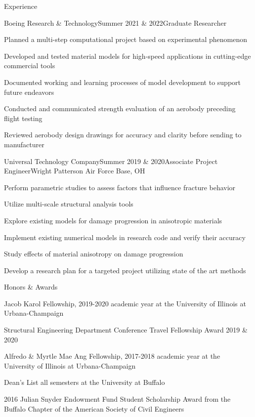 \documentclass{resume} %
\begin{document}
\begin{rSection}{Experience}

\begin{rSubsection}{Boeing Research \& Technology}{Summer 2021  \& 2022}{Graduate Researcher}{}
%
\item Planned a multi-step computational project based on experimental phenomenon
\item Developed and tested material models for high-speed applications in cutting-edge commercial tools
\item Documented working and learning processes of model development to support future endeavors
\item Conducted and communicated strength evaluation of an aerobody preceding flight testing
\item Reviewed aerobody design drawings for accuracy and clarity before sending to manufacturer
\end{rSubsection}

\begin{rSubsection}{Universal Technology Company}{Summer 2019 \& 2020}{Associate Project Engineer}{Wright Patterson Air Force Base, OH}
\item Perform parametric studies to assess factors that influence fracture behavior
\item Utilize multi-scale structural analysis tools
\item Explore existing models for damage progression in anisotropic materials
\item Implement existing numerical models in research code and verify their accuracy
\item Study effects of material anisotropy on damage progression
\item Develop a research plan for a targeted project utilizing state of the art methods
\end{rSubsection}

\end{rSection}


\begin{rSection}{Honors \& Awards}{}
\begin{rSubsection}{}{}{}{}
\item Jacob Karol Fellowship, 2019-2020 academic year at the University of Illinois at Urbana-Champaign
\item Structural Engineering Department Conference Travel Fellowship Award 2019 \& 2020
\item Alfredo \& Myrtle Mae Ang Fellowship, 2017-2018 academic year at the University of Illinois at Urbana-Champaign
\item Dean's List all semesters at the University at Buffalo
\item 2016 Julian Snyder Endowment Fund Student Scholarship Award from the Buffalo Chapter of the American Society of Civil Engineers
\end{rSubsection}
\end{rSection}
\end{document}
